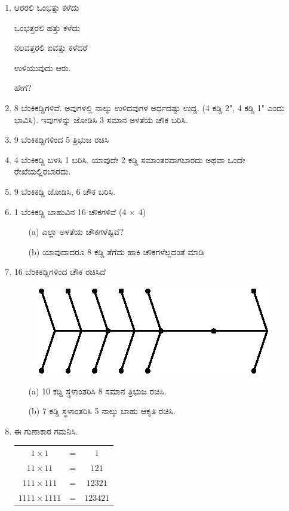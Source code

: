 \begin{enumerate}
\item ಆರರಲಿ ಒಂಭತ್ತು ಕಳೆದು 

ಒಂಭತ್ತರಲಿ ಹತ್ತು ಕಳೆದು 

ನಲವತ್ತರಲಿ ಐವತ್ತು ಕಳೆದರೆ 

ಉಳಿಯುವುದು ಆರು.

ಹೇಗೆ?

\item 8 ಬೆಂಕಿಕಡ್ಡಿಗಳಿವೆ. ಅವುಗಳಲ್ಲಿ ನಾಲ್ಕು ಉಳಿದವುಗಳ ಅರ್ಧದಷ್ಟು ಉದ್ದ. (4 ಕಡ್ಡಿ  2", 4 ಕಡ್ಡಿ 1" ಎಂದು ಭಾವಿಸಿ). ಇವುಗಳನ್ನು ಜೋಡಿಸಿ 3 ಸಮಾನ ಅಳತೆಯ ಚೌಕ ಬರಿಸಿ. 

\item 9 ಬೆಂಕಿಕಡ್ಡಿಗಳಿಂದ 5 ತ್ರಿಭುಜ ರಚಿಸಿ 

\item 4 ಬೆಂಕಿಕಡ್ಡಿ ಬಳಸಿ 1 ಬರಿಸಿ. ಯಾವುದೇ 2 ಕಡ್ಡಿ ಸಮಾಂತರವಾಗಬಾರದು ಅಥವಾ ಒಂದೇ ರೇಖೆಯಲ್ಲಿರಬಾರದು.

\item 9 ಬೆಂಕಿಕಡ್ಡಿ ಜೋಡಿಸಿ, 6 ಚೌಕ ಬರಿಸಿ.

\item 1 ಬೆಂಕಿಕಡ್ಡಿ ಬಾಹುವಿನ 16 ಚೌಕಗಳಿವೆ (4 $\times$ 4)
\begin{itemize}
\item[(a)] ಎಲ್ಲಾ ಅಳತೆಯ ಚೌಕಗಳೆಷ್ಟಿವೆ? 
\item[(b)] ಯಾವುದಾದರೂ 8 ಕಡ್ಡಿ ತೆಗೆದು ಹಾಕಿ ಚೌಕಗಳೆಲ್ಲದಂತೆ ಮಾಡಿ 
\end{itemize}

\item 16 ಬೆಂಕಿಕಡ್ಡಿಗಳಿಂದ ಚೌಕ ರಚಿಸಿದೆ 
\begin{figure}[H]
\centering
\includegraphics{images/chap4/q18.eps}
\end{figure}
\begin{itemize}
\item[(a)] 10 ಕಡ್ಡಿ ಸ್ಥಳಾಂತರಿಸಿ 8 ಸಮಾನ ತ್ರಿಭುಜ ರಚಿಸಿ.
\item[(b)] 7 ಕಡ್ಡಿ ಸ್ಥಳಾಂತರಿಸಿ 5 ನಾಲ್ಕು ಬಾಹು ಆಕೃತಿ ರಚಿಸಿ.
\end{itemize}

\item ಈ ಗುಣಾಕಾರ ಗಮನಿಸಿ.

\begin{tabular}[t]{ccc}
$1 \times 1$ & = & $1$\\
$11 \times 11$ & = & $121$\\
$111 \times 111$ & = & $12321$\\
$1111 \times 1111$ & = & $123421$
\end{tabular}


\end{enumerate}
